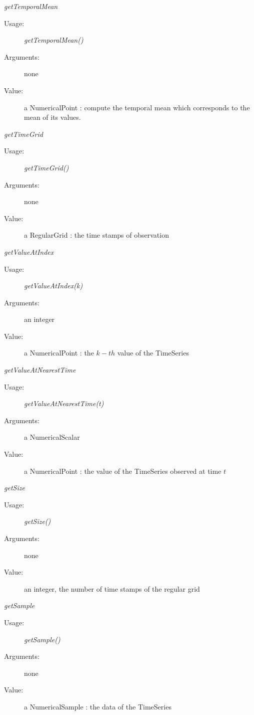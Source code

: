 \begin{description}
\begin{description}
\item \textit{getTemporalMean}
\begin{description}
\item[Usage:] \textit{getTemporalMean()}
\item[Arguments:] none
\item[Value:] a NumericalPoint : compute the temporal mean which corresponds to the mean of its values.
\end{description}
\bigskip

\item \textit{getTimeGrid}
\begin{description}
\item[Usage:] \textit{getTimeGrid()}
\item[Arguments:] none
\item[Value:] a RegularGrid : the time stamps of observation
\end{description}
\bigskip

\item \textit{getValueAtIndex}
\begin{description}
\item[Usage:] \textit{getValueAtIndex(k)}
\item[Arguments:] an integer
\item[Value:] a NumericalPoint : the $k-th$ value of the TimeSeries
\end{description}
\bigskip

\item \textit{getValueAtNearestTime}
\begin{description}
\item[Usage:] \textit{getValueAtNearestTime(t)}
\item[Arguments:] a NumericalScalar
\item[Value:] a NumericalPoint : the value of the TimeSeries observed at time $t$
\end{description}
\bigskip

\item \textit{getSize}
\begin{description}
\item[Usage:] \textit{getSize()}
\item[Arguments:] none
\item[Value:] an integer, the number of time stamps of the regular grid
\end{description}
\bigskip

\item \textit{getSample}
\begin{description}
\item[Usage:] \textit{getSample()}
\item[Arguments:] none
\item[Value:] a NumericalSample : the data of the TimeSeries
\end{description}
\bigskip


\end{description}
\end{description}
